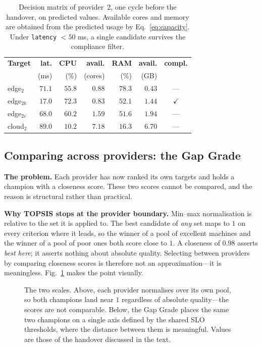 \documentclass[conference]{IEEEtran}
\begin{document}
\begin{table}[t]
\centering
\caption{Decision matrix of provider~2, one cycle before the handover, on
predicted values. Available cores and memory are obtained from the predicted
usage by Eq.~\eqref{eq:capacity}. Under \texttt{latency} $<50$ ms, a single
candidate survives the compliance filter.}
\label{tab:matrix}
\footnotesize
\setlength{\tabcolsep}{4pt}
\begin{tabular}{@{}lrrrrrc@{}}
\toprule
\textbf{Target} & \textbf{lat.} & \textbf{CPU} & \textbf{avail.}
& \textbf{RAM} & \textbf{avail.} & \textbf{compl.}\\
 & (ms) & (\%) & (cores) & (\%) & (GB) & \\
\midrule
edge$_2$   & $71.1$ & $55.8$ & $0.88$ & $78.3$ & $0.43$ & --- \\
edge$_{2b}$ & $\mathbf{17.0}$ & $72.3$ & $0.83$ & $52.1$ & $1.44$
           & $\checkmark$ \\
edge$_{2c}$ & $68.0$ & $60.2$ & $1.59$ & $51.6$ & $1.94$ & --- \\
cloud$_2$  & $89.0$ & $10.2$ & $\mathbf{7.18}$ & $16.3$ & $\mathbf{6.70}$
           & --- \\
\bottomrule
\end{tabular}
\end{table}

\subsection{Comparing across providers: the Gap Grade}
\label{sec:gap}

\textbf{The problem.} Each provider has now ranked its own targets and holds a
champion with a closeness score. These two scores cannot be compared, and the
reason is structural rather than practical.

\textbf{Why TOPSIS stops at the provider boundary.} Min--max normalisation is
relative to the set it is applied to. The best candidate of \emph{any} set
maps to $1$ on every criterion where it leads, so the winner of a pool of
excellent machines and the winner of a pool of poor ones both score close to
$1$. A closeness of $0.98$ asserts \emph{best here}; it asserts nothing about
absolute quality. Selecting between providers by comparing closeness scores is
therefore not an approximation---it is meaningless.
Fig.~\ref{fig:twoscales} makes the point visually.

\begin{figure}[t]
\centering
\resizebox{\columnwidth}{!}{}
\caption{The two scales. Above, each provider normalises over its own pool, so
both champions land near $1$ regardless of absolute quality---the scores are
not comparable. Below, the Gap Grade places the same two champions on a single
axis defined by the shared SLO thresholds, where the distance between them is
meaningful. Values are those of the handover discussed in the text.}
\label{fig:twoscales}
\end{figure}
\end{document}

